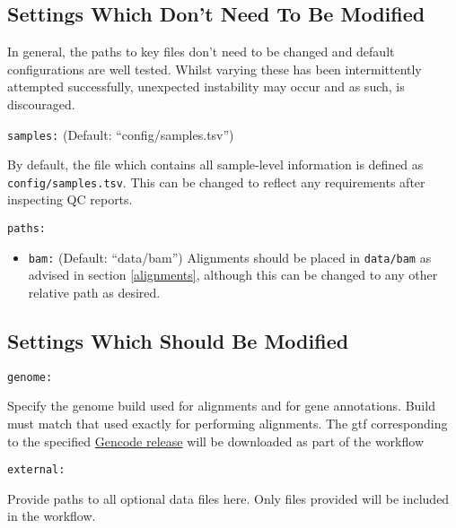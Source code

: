 \documentclass[
]{book}
\providecommand{\tightlist}{%
  \setlength{\itemsep}{0pt}\setlength{\parskip}{0pt}}
\begin{document}
\hypertarget{settings-which-dont-need-to-be-modified}{%
\subsection*{Settings Which Don't Need To Be Modified}\label{settings-which-dont-need-to-be-modified}}

In general, the paths to key files don't need to be changed and default configurations are well tested.
Whilst varying these has been intermittently attempted successfully, unexpected instability may occur and as such, is discouraged.

\texttt{samples:} (Default: ``config/samples.tsv'')

By default, the file which contains all sample-level information is defined as \texttt{config/samples.tsv}.
This can be changed to reflect any requirements after inspecting QC reports.

\texttt{paths:}

\begin{itemize}
\tightlist
\item
  \texttt{bam:} (Default: ``data/bam'') Alignments should be placed in \texttt{data/bam} as advised in section \ref{alignments}, although this can be changed to any other relative path as desired.
\end{itemize}

\hypertarget{settings-which-should-be-modified}{%
\subsection*{Settings Which Should Be Modified}\label{settings-which-should-be-modified}}

\texttt{genome:}

Specify the genome build used for alignments and for gene annotations.
Build must match that used exactly for performing alignments.
The gtf corresponding to the specified \href{https://www.gencodegenes.org/}{Gencode release} will be downloaded as part of the workflow

\texttt{external:}

Provide paths to all optional data files here.
Only files provided will be included in the workflow.
\end{document}
